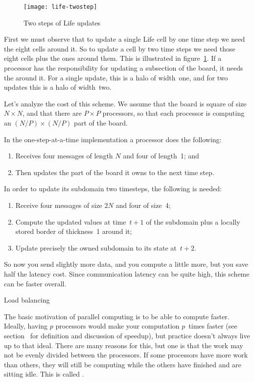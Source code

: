 \begin{figure}[t]
  \texttt{[image: life-twostep]}
  \caption{Two steps of Life updates}
  \label{fig:twostep}
\end{figure}

First we must observe that to update a single Life cell 
by one time step we need the eight cells around it. So to update
a cell by two time steps we need those eight cells plus the ones around them.
This is illustrated in figure~\ref{fig:twostep}.
If a processor has the responsibility for updating a subsection of the board,
it needs the 
around it. For a single update, this is a halo of width~one, and
for two updates this is a halo of width~two.

Let's analyze the cost of this scheme. We assume that the board is
square of size $N\times N$, and that there are $P\times P$ processors,
so that each processor is computing an $(N/P)\times(N/P)$ part of the board.

In the one-step-at-a-time implementation a processor does the following:
\begin{enumerate}
\item Receives four messages of length $N$ and four of length~1; and
\item Then updates the part of the board it owns to the next time step.
\end{enumerate}
In order to update its subdomain two timesteps, the following is needed:
\begin{enumerate}
\item Receive four messages of size $2 N$ and four of size~4;
\item Compute the updated values at time~$t+1$ of the subdomain plus
  a locally stored border of thickness~1 around it;
\item Update precisely the owned subdomain to its state at~$t+2$.
\end{enumerate}
So now you send slightly more data, and you compute a little more,
but you save half the latency cost. Since communication latency can 
be quite high, this scheme can be faster overall.

 {Load balancing}

The basic motivation of parallel computing is to be able to compute
faster.  Ideally, having $p$ processors would make your computation
$p$~times faster (see section~ for
definition and discussion of speedup), but practice doesn't always
live up to that ideal. There are many reasons for this, but one is
that the work may not be evenly divided between the processors.  If
some processors have more work than others, they will still be
computing while the others have finished and are sitting idle. This is
called .

